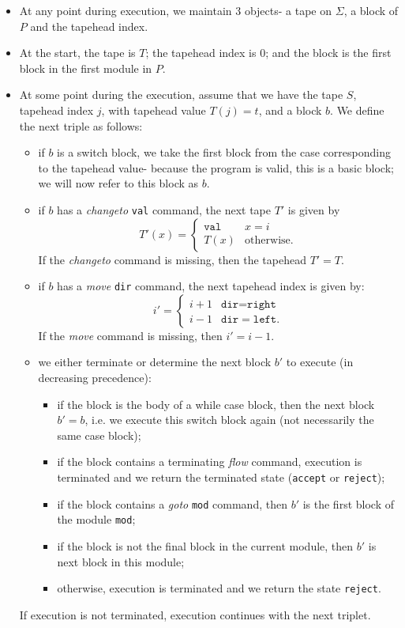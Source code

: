 \begin{itemize}
    \item At any point during execution, we maintain 3 objects- a tape on $\Sigma$, a block of $P$ and the tapehead index. 
    \item At the start, the tape is $T$; the tapehead index is $0$; and the block is the first block in the first module in $P$. 
    \item At some point during the execution, assume that we have the tape $S$, tapehead index $j$, with tapehead value $T(j) = t$, and a block $b$. We define the next triple as follows:
    \begin{itemize}
        \item if $b$ is a switch block, we take the first block from the case corresponding to the tapehead value- because the program is valid, this is a basic block; we will now refer to this block as $b$.
        \item if $b$ has a \textit{changeto} \texttt{val} command, the next tape $T'$ is given by 
        \[T'(x) = \begin{cases}
            \texttt{val} & x = i \\
            T(x) & \text{otherwise}.
        \end{cases}\]
        If the \textit{changeto} command is missing, then the tapehead $T' = T$.
        \item if $b$ has a \textit{move} \texttt{dir} command, the next tapehead index is given by:
        \[i' = \begin{cases}
            i+1 & \texttt{dir} = \texttt{right} \\
            i-1 & \texttt{dir} = \texttt{left}.
        \end{cases}\]
        If the \textit{move} command is missing, then $i' = i-1$.
        \item we either terminate or determine the next block $b'$ to execute (in decreasing precedence):
        \begin{itemize}
            \item if the block is the body of a while case block, then the next block $b' = b$, i.e. we execute this switch block again (not necessarily the same case block);
            \item if the block contains a terminating \textit{flow} command, execution is terminated and we return the terminated state (\texttt{accept} or \texttt{reject});
            \item if the block contains a \textit{goto} \texttt{mod} command, then $b'$ is the first block of the module \texttt{mod};
            \item if the block is not the final block in the current module, then $b'$ is next block in this module;
            \item otherwise, execution is terminated and we return the state \texttt{reject}.
        \end{itemize}
    \end{itemize}
    If execution is not terminated, execution continues with the next triplet.
\end{itemize}

